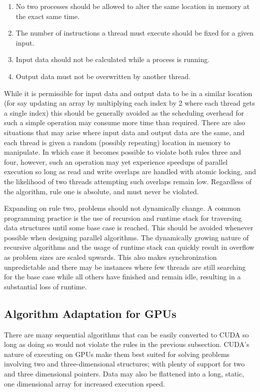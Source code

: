 \documentclass[11pt]{report}
\begin{document}
        \begin{enumerate}
            \item No two processes should be allowed to alter the same location in memory at the exact same time.
            \item The number of instructions a thread must execute should be fixed for a given input.
            \item Input data should not be calculated while a process is running.
            \item Output data must not be overwritten by another thread.
        \end{enumerate}

        While it is permissible for input data and output data to be in a similar location (for say updating an array by multiplying each index by 2 where each thread gets a single index) this should be generally avoided as the scheduling overhead for such a simple operation may consume more time than required. There are also situations that may arise where input data and output data are the same, and each thread is given a random (possibly repeating) location in memory to manipulate. In which case it becomes possible to violate both rules three and four, however, such an operation may yet experience speedups of parallel execution so long as read and write overlaps are handled with atomic locking, and the likelihood of two threads attempting such overlaps remain low. Regardless of the algorithm, rule one is absolute, and must never be violated.

        Expanding on rule two, problems should not dynamically change. A common programming practice is the use of recursion and runtime stack for traversing data structures until some base case is reached. This should be avoided whenever possible when designing parallel algorithms. The dynamically growing nature of recursive algorithms and the usage of runtime stack can quickly result in overflow as problem sizes are scaled upwards. This also makes synchronization unpredictable and there may be instances where few threads are still searching for the base case while all others have finished and remain idle, resulting in a substantial loss of runtime.


        \subsection{Algorithm Adaptation for GPUs}
        There are many sequential algorithms that can be easily converted to CUDA so long as doing so would not violate the rules in the previous subsection. CUDA's nature of executing on GPUs make them best suited for solving problems involving two and three-dimensional structures; with plenty of support for two and three dimensional pointers. Data may also be flattened into a long, static, one dimensional array for increased execution speed.
\end{document}
